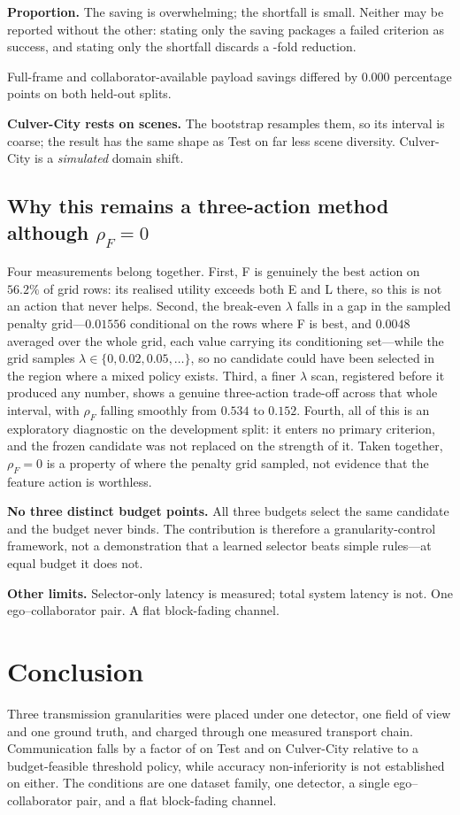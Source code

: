 \documentclass[journal]{IEEEtran}
\begin{document}
\textbf{Proportion.} The saving is overwhelming; the shortfall is small. Neither may be reported
without the other: stating only the saving packages a failed criterion as success, and stating only
the shortfall discards a \TestRatio-fold reduction.

Full-frame and collaborator-available payload savings differed by $0.000$ percentage points on both
held-out splits.

\textbf{Culver-City rests on \CulverScenes{} scenes.} The bootstrap resamples them, so its interval
is coarse; the result has the same shape as Test on far less scene diversity. Culver-City is a
\emph{simulated} domain shift.

\subsection{Why this remains a three-action method although $\rho_F=0$}
Four measurements belong together. First, F is genuinely the best action on $56.2\%$ of grid rows:
its realised utility exceeds both E and L there, so this is not an action that never helps. Second,
the break-even $\lambda$ falls in a gap in the sampled penalty grid---$0.01556$ conditional on the
rows where F is best, and $0.0048$ averaged over the whole grid, each value carrying its
conditioning set---while the grid samples $\lambda\in\{0,0.02,0.05,\dots\}$, so no candidate could
have been selected in the region where a mixed policy exists. Third, a finer $\lambda$ scan,
registered before it produced any number, shows a genuine three-action trade-off across that whole
interval, with $\rho_F$ falling smoothly from $0.534$ to $0.152$. Fourth, all of this is an
exploratory diagnostic on the development split: it enters no primary criterion, and the frozen
candidate was not replaced on the strength of it. Taken together, $\rho_F=0$ is a property of where
the penalty grid sampled, not evidence that the feature action is worthless.

\textbf{No three distinct budget points.} All three budgets select the same candidate and the budget
never binds. The contribution is therefore a granularity-control framework, not a demonstration that
a learned selector beats simple rules---at equal budget it does not.

\textbf{Other limits.} Selector-only latency is measured; total system latency is not. One
ego--collaborator pair. A flat block-fading channel.

\section{Conclusion}
Three transmission granularities were placed under one detector, one field of view and one ground
truth, and charged through one measured transport chain. Communication falls by a factor of
\TestRatio{} on Test and \CulverRatio{} on Culver-City relative to a budget-feasible threshold
policy, while accuracy non-inferiority is not established on either. The conditions are one dataset family, one
detector, a single ego--collaborator pair, and a flat block-fading channel.



\end{document}
